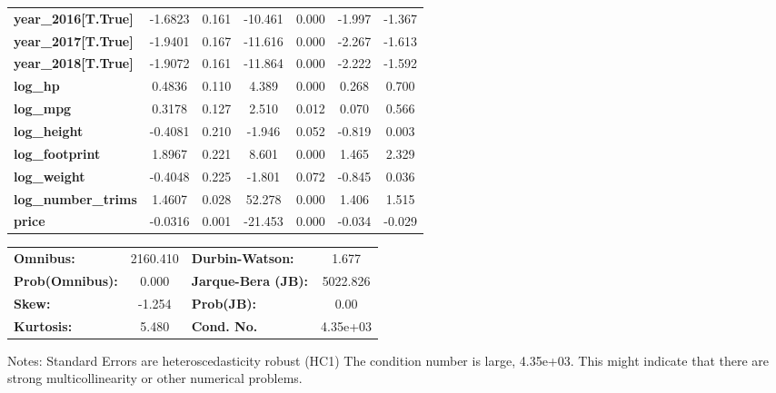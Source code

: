 \begin{center}
\begin{tabular}{lcccccc}
\textbf{year\_2016[T.True]} &      -1.6823  &        0.161     &   -10.461  &         0.000        &       -1.997    &       -1.367     \\
\textbf{year\_2017[T.True]} &      -1.9401  &        0.167     &   -11.616  &         0.000        &       -2.267    &       -1.613     \\
\textbf{year\_2018[T.True]} &      -1.9072  &        0.161     &   -11.864  &         0.000        &       -2.222    &       -1.592     \\
\textbf{log\_hp}            &       0.4836  &        0.110     &     4.389  &         0.000        &        0.268    &        0.700     \\
\textbf{log\_mpg}           &       0.3178  &        0.127     &     2.510  &         0.012        &        0.070    &        0.566     \\
\textbf{log\_height}        &      -0.4081  &        0.210     &    -1.946  &         0.052        &       -0.819    &        0.003     \\
\textbf{log\_footprint}     &       1.8967  &        0.221     &     8.601  &         0.000        &        1.465    &        2.329     \\
\textbf{log\_weight}        &      -0.4048  &        0.225     &    -1.801  &         0.072        &       -0.845    &        0.036     \\
\textbf{log\_number\_trims} &       1.4607  &        0.028     &    52.278  &         0.000        &        1.406    &        1.515     \\
\textbf{price}              &      -0.0316  &        0.001     &   -21.453  &         0.000        &       -0.034    &       -0.029     \\
\bottomrule
\end{tabular}
\begin{tabular}{lclc}
\textbf{Omnibus:}       & 2160.410 & \textbf{  Durbin-Watson:     } &    1.677  \\
\textbf{Prob(Omnibus):} &   0.000  & \textbf{  Jarque-Bera (JB):  } & 5022.826  \\
\textbf{Skew:}          &  -1.254  & \textbf{  Prob(JB):          } &     0.00  \\
\textbf{Kurtosis:}      &   5.480  & \textbf{  Cond. No.          } & 4.35e+03  \\
\bottomrule
\end{tabular}
\end{center}

Notes: \newline
 [1] Standard Errors are heteroscedasticity robust (HC1) \newline
 [2] The condition number is large, 4.35e+03. This might indicate that there are \newline
 strong multicollinearity or other numerical problems.